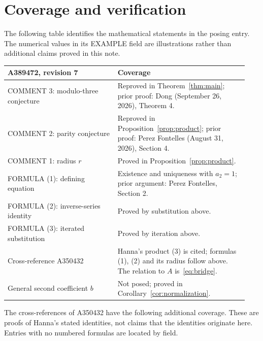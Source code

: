 \documentclass[11pt]{article}
\begin{document}
\section{Coverage and verification}
The following table identifies the mathematical statements in the posing
entry. The numerical values in its EXAMPLE field are illustrations rather
than additional claims proved in this note.
\begin{center}
\small
\begin{tabular}{@{}p{0.43\linewidth}p{0.51\linewidth}@{}}
\toprule
A389472, revision 7 & Coverage \\
\midrule
COMMENT 3: modulo-three conjecture & Reproved in Theorem~\ref{thm:main};
prior proof: Dong (September 26, 2026), Theorem 4. \\
COMMENT 2: parity conjecture & Reproved in Proposition~\ref{prop:product};
prior proof: Perez Fontelles (August 31, 2026), Section 4. \\
COMMENT 1: radius $r$ & Proved in Proposition~\ref{prop:product}. \\
FORMULA (1): defining equation & Existence and uniqueness with $a_2=1$;
prior argument: Perez Fontelles, Section 2. \\
FORMULA (2): inverse-series identity & Proved by substitution above. \\
FORMULA (3): iterated substitution & Proved by iteration above. \\
Cross-reference A350432 & Hanna's product (3) is cited; formulas (1), (2)
and its radius follow above. The relation to $A$ is~\eqref{eq:bridge}. \\
General second coefficient $b$ & Not posed; proved in
Corollary~\ref{cor:normalization}. \\
\bottomrule
\end{tabular}
\end{center}
The cross-references of A350432 have the following additional coverage.
These are proofs of Hanna's stated identities, not claims that the identities
originate here. Entries with no numbered formulas are located by field.
\end{document}
